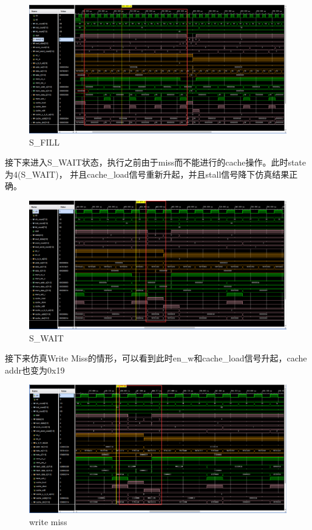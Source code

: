 \begin{figure}[H]
    \centering
    \includegraphics[width=1.0\textwidth]{figs/sres3.png}
    \caption{S_FILL}
    \label{Fig.6}
\end{figure}

接下来进入S\_WAIT状态，执行之前由于miss而不能进行的cache操作。此时state为4(S\_WAIT)，
并且cache\_load信号重新升起，并且stall信号降下仿真结果正确。

\begin{figure}[H]
    \centering
    \includegraphics[width=1.0\textwidth]{figs/sres4.png}
    \caption{S_WAIT}
    \label{Fig.7}
\end{figure}

接下来仿真Write Miss的情形，可以看到此时en\_w和cache\_load信号升起，cache addr也变为0x19

\begin{figure} [H]
    \centering
    \includegraphics[width=1.0\textwidth]{figs/sres5.png}
    \caption{write miss}
    \label{Fig.8}
\end{figure}


